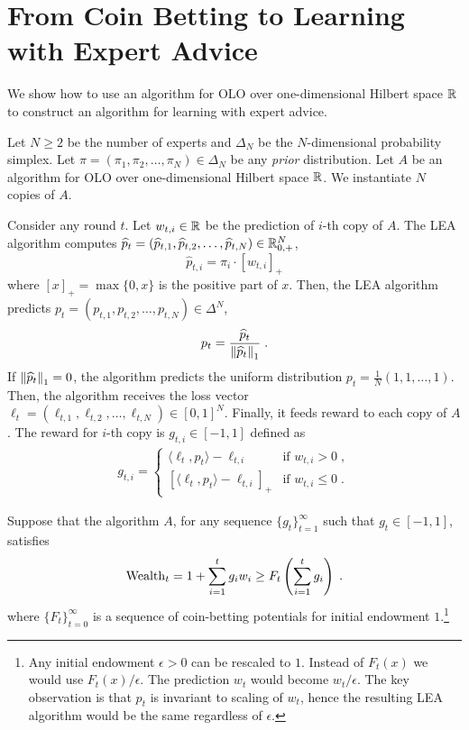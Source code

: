 \section{From Coin Betting to Learning with Expert Advice}
\label{section:reduction-experts}

We show how to use an algorithm for OLO over one-dimensional Hilbert space $\mathbb{R}$
to construct an algorithm for learning with expert advice.

Let $N \ge 2$ be the number of experts and $\Delta_N$ be the $N$-dimensional
probability simplex. Let $\pi = (\pi_1, \pi_2, \dots, \pi_N) \in \Delta_N$ be
any \emph{prior} distribution. Let $A$ be an algorithm for OLO over
one-dimensional Hilbert space $\mathbb{R}$. We instantiate $N$ copies of $A$.

Consider any round $t$. Let $w_{t,i} \in \mathbb{R}$ be the prediction of $i$-th copy of
$A$. The LEA algorithm computes $\widehat p_t = (\widehat p_{t,1}, \widehat
p_{t,2}, \dots, \widehat p_{t,N}) \in \mathbb{R}_{0,+}^N$,
$$
\widehat p_{t,i} = \pi_i \cdot [w_{t,i}]_+
$$
where $[x]_+ = \max\{0,x\}$ is the positive part of $x$. Then, the LEA
algorithm predicts $p_t = (p_{t,1}, p_{t,2}, \dots, p_{t,N}) \in \Delta^N$,
$$
p_t = \frac{\widehat p_t}{\left\|{\widehat p_t}\right\|_1} \; .
$$
If $\left\|{\widehat p_t}\right\|_1 = 0$, the algorithm predicts the uniform distribution
$p_t = \frac{1}{N}(1,1,\dots,1)$. Then, the algorithm receives the loss vector
$\ell_t = (\ell_{t,1}, \ell_{t,2}, \dots, \ell_{t,N}) \in [0,1]^N$. Finally, it
feeds reward to each copy of $A$. The reward for $i$-th copy is $g_{t,i} \in
[-1,1]$ defined as
\begin{align}
\label{eq:gradients_experts_reduction}
g_{t,i} =
\begin{cases}
\langle \ell_t, p_t \rangle - \ell_{t,i} & \text{if } w_{t,i} > 0 \; , \\
\left[\langle \ell_t, p_t \rangle - \ell_{t,i} \right]_+ & \text{if } w_{t,i} \le 0 \; .
\end{cases}
\end{align}

Suppose that the algorithm $A$, for any sequence
$\{g_t\}_{t=1}^\infty$ such that $g_t \in [-1,1]$, satisfies
\begin{equation}
\label{equation:experts-one-dimensional-assumption}
\operatorname{Wealth}_t = 1 + \sum_{i=1}^t g_i w_i \ge F_t\left(\sum_{i=1}^t g_i\right) \; .
\end{equation}
where $\{F_t\}_{t=0}^\infty$ is a sequence of coin-betting potentials for
initial endowment $1$.\footnote{Any initial endowment $\epsilon > 0$ can be
rescaled to $1$. Instead of $F_t(x)$ we would use $F_t(x)/\epsilon$. The
prediction $w_t$ would become $w_t/\epsilon$. The key observation is that $p_t$
is invariant to scaling of $w_t$, hence the resulting LEA algorithm would be the
same regardless of $\epsilon$.}


